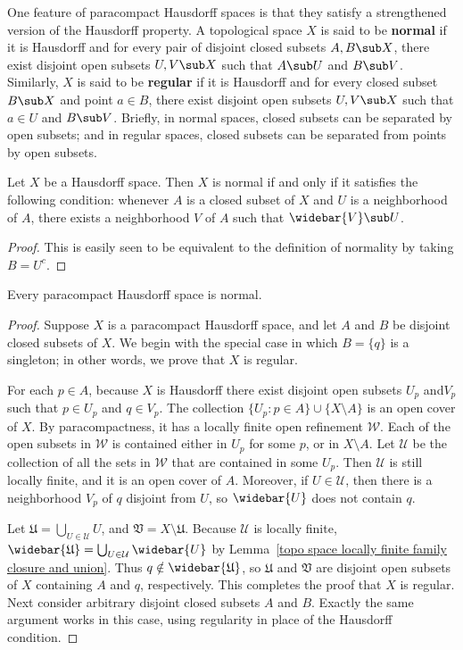 One feature of paracompact Hausdorff spaces is that they satisfy a strengthened version of the Hausdorff property. A topological space $X$ is said to be \textbf{normal} if it is Hausdorff and for every pair of disjoint closed subsets $A,B\sub X$, there exist disjoint open subsets $U,V\sub X$ such that $A\sub U$ and $B\sub V$. Similarly, $X$ is said to be \textbf{regular} if it is Hausdorff and for every closed subset $B\sub X$ and point $a\in B$, there exist disjoint open subsets $U,V\sub X$ such that $a\in U$ and $B\sub V$. Briefly, in normal spaces, closed subsets can be separated by open subsets; and in regular spaces, closed subsets can be separated from points by open subsets.
\begin{lemma}\label{Hausdorff normal iff}
Let $X$ be a Hausdorff space. Then $X$ is normal if and only if it satisfies the following condition: whenever $A$ is a closed subset of $X$ and $U$ is a neighborhood of $A$, there exists a neighborhood $V$ of $A$ such that $\widebar{V}\sub U$.
\end{lemma}
\begin{proof}
This is easily seen to be equivalent to the definition of normality by taking
$B=U^c$.
\end{proof}
\begin{theorem}\label{para is normal}
Every paracompact Hausdorff space is normal.
\end{theorem}
\begin{proof}
Suppose $X$ is a paracompact Hausdorff space, and let $A$ and $B$ be disjoint closed subsets of $X$. We begin with the special case in which $B=\{q\}$ is a singleton; in other words, we prove that $X$ is regular.\par
For each $p\in A$, because $X$ is Hausdorff there exist disjoint open subsets $U_p$ and$V_p$ such that $p\in U_p$ and $q\in V_p$. The collection $\{U_p:p\in A\}\cup\{X\setminus A\}$ is an open cover of $X$. By paracompactness, it has a locally finite open refinement $\mathcal{W}$. Each of the open subsets in $\mathcal{W}$ is contained either in $U_p$ for some $p$, or in $X\setminus A$. Let $\mathcal{U}$ be the collection of all the sets in $\mathcal{W}$ that are contained in some $U_p$. Then $\mathcal{U}$ is
still locally finite, and it is an open cover of $A$. Moreover, if $U\in\mathcal{U}$, then there is a neighborhood $V_p$ of $q$ disjoint from $U$, so $\widebar{U}$ does not contain $q$.\par
Let $\mathfrak{U}=\bigcup_{U\in\mathcal{U}}U$, and $\mathfrak{V}=X\setminus \mathfrak{U}$. Because $\mathcal{U}$ is locally finite, $\widebar{\mathfrak{U}}=\bigcup_{U\in\mathcal{U}}\widebar{U}$
by Lemma~\ref{topo space locally finite family closure and union}. Thus $q\notin\widebar{\mathfrak{U}}$, so $\mathfrak{U}$ and $\mathfrak{V}$ are disjoint open subsets of $X$ containing $A$ and $q$, respectively. This completes the proof that $X$ is regular. Next consider arbitrary disjoint closed subsets $A$ and $B$. Exactly the same argument
works in this case, using regularity in place of the Hausdorff condition.
\end{proof}
